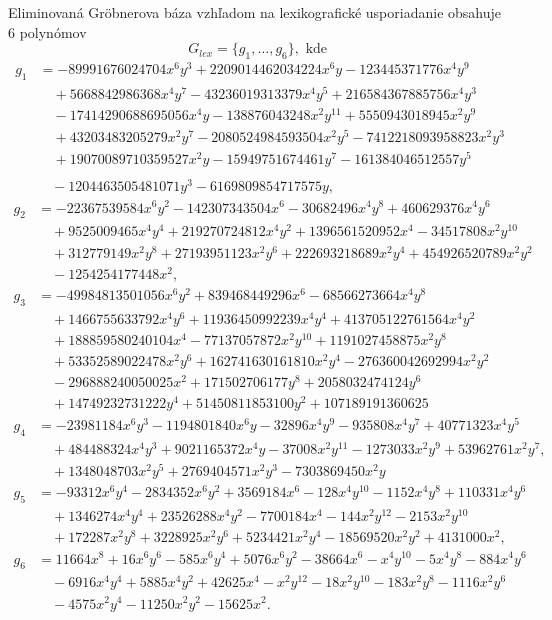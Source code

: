 Eliminovaná Gröbnerova báza vzhľadom na lexikografické usporiadanie obsahuje $6$ polynómov $$ G_{lex} = \{g_1,\dots, g_6 \}, \text{ kde } $$
\begin{align*}
g_1 &= -89991676024704x^6y^3 + 2209014462034224x^6y - 123445371776x^4y^9 \\ 
&\quad + 5668842986368x^4y^7 - 43236019313379x^4y^5 + 216584367885756x^4y^3 \\ 
&\quad - 17414290688695056x^4y - 138876043248x^2y^11 + 5550943018945x^2y^9\\ 
&\quad + 43203483205279x^2y^7 - 2080524984593504x^2y^5 - 7412218093958823x^2y^3 \\ 
&\quad + 19070089710359527x^2y - 15949751674461y^7 - 161384046512557y^5  \\ 
\end{align*}
\begin{align*}
&\quad - 1204463505481071y^3 - 6169809854717575y, \\
g_2 &= -22367539584x^6y^2 - 142307343504x^6 - 30682496x^4y^8  + 460629376x^4y^6 \\ 
&\quad + 9525009465x^4y^4 + 219270724812x^4y^2 + 1396561520952x^4 - 34517808x^2y^{10} \\ 
&\quad  + 312779149x^2y^8 + 27193951123x^2y^6 + 222693218689x^2y^4 + 454926520789x^2y^2  \\ 
&\quad - 1254254177448x^2, \\
g_3 &= -49984813501056x^6y^2 + 839468449296x^6 - 68566273664x^4y^8 \\ 
&\quad  + 1466755633792x^4y^6 + 11936450992239x^4y^4 + 413705122761564x^4y^2 \\ 
&\quad  + 188859580240104x^4 - 77137057872x^2y^{10} + 1191027458875x^2y^8 \\ 
&\quad  + 53352589022478x^2y^6  + 162741630161810x^2y^4 - 276360042692994x^2y^2 \\ 
&\quad - 296888240050025x^2 + 171502706177y^8 + 2058032474124y^6  \\ 
&\quad + 14749232731222y^4 + 51450811853100y^2 + 107189191360625 \\
g_4 &= -23981184x^6y^3 - 1194801840x^6y - 32896x^4y^9  - 935808x^4y^7 + 40771323x^4y^5 \\ 
&\quad + 484488324x^4y^3 + 9021165372x^4y - 37008x^2y^{11} - 1273033x^2y^9 + 53962761x^2y^7, \\ 
&\quad   + 1348048703x^2y^5 + 2769404571x^2y^3 - 7303869450x^2y \\ 
g_5 &= -93312x^6y^4 - 2834352x^6y^2 + 3569184x^6 - 128x^4y^{10}  - 1152x^4y^8 + 110331x^4y^6 \\ 
&\quad  + 1346274x^4y^4 + 23526288x^4y^2 - 7700184x^4 - 144x^2y^{12} - 2153x^2y^{10}  \\ 
&\quad  + 172287x^2y^8 + 3228925x^2y^6 + 5234421x^2y^4 - 18569520x^2y^2 + 4131000x^2, \\ 
g_6 &= 11664x^8 + 16x^6y^6 - 585x^6y^4 + 5076x^6y^2 - 38664x^6  - x^4y^{10} - 5x^4y^8 - 884x^4y^6 \\ 
&\quad - 6916x^4y^4 + 5885x^4y^2 + 42625x^4 - x^2y^{12} - 18x^2y^{10} - 183x^2y^8 - 1116x^2y^6 \\ 
&\quad  - 4575x^2y^4 - 11250x^2y^2 - 15625x^2.\\ 
\end{align*}
